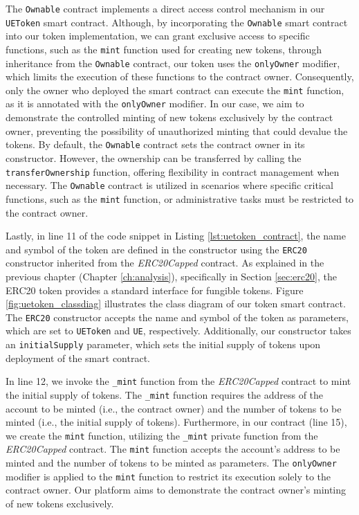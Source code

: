 


The \texttt{Ownable} contract implements a direct access control mechanism in our \texttt{UEToken} smart contract. Although, by incorporating the
\texttt{Ownable} smart contract into our token implementation, we can grant exclusive access to specific functions, such as the \texttt{mint} function used for creating new tokens, through inheritance from the \texttt{Ownable} contract, our token uses the \texttt{onlyOwner} modifier,
which limits the execution of these functions to the contract owner. Consequently, only the owner who deployed the smart contract can execute
the \texttt{mint} function, as it is annotated with the \texttt{onlyOwner} modifier. In our case, we aim to demonstrate the controlled minting
of new tokens exclusively by the contract owner, preventing the possibility of unauthorized minting that could devalue the tokens.
By default, the \texttt{Ownable} contract sets the contract owner in its constructor. However, the ownership can be transferred by calling the
\texttt{transferOwnership} function, offering flexibility in contract management when necessary. The \texttt{Ownable} contract is utilized in
scenarios where specific critical functions, such as the \texttt{mint} function, or administrative tasks must be restricted to the contract
owner.


Lastly, in line 11 of the code snippet in Listing \ref{lst:uetoken_contract}, the name and symbol of the token are defined in the constructor using the \texttt{ERC20} constructor inherited from the \textit{ERC20Capped} contract. As explained in the previous chapter (Chapter \ref{ch:analysis}), specifically in Section \ref{sec:erc20}, the ERC20 token provides a standard interface for fungible tokens. Figure \ref{fig:uetoken_classdiag} illustrates the class diagram of our token smart contract. The \texttt{ERC20} constructor accepts the name and symbol of the token as parameters, which are set to \texttt{UEToken} and \texttt{UE}, respectively. Additionally, our constructor takes an \texttt{initialSupply} parameter, which sets the initial supply of tokens upon deployment of the smart contract.

In line 12, we invoke the \texttt{\_mint} function from the \textit{ERC20Capped} contract to mint the initial supply of tokens. The \texttt{\_mint} function requires the address of the account to be minted (i.e., the contract owner) and the number of tokens to be minted (i.e., the initial supply of tokens). Furthermore, in our contract (line 15), we create the \texttt{mint} function, utilizing the \texttt{\_mint} private function from the \textit{ERC20Capped} contract. The \texttt{mint} function accepts the account's address to be minted and the number of tokens to be minted as parameters. The \texttt{onlyOwner} modifier is applied to the \texttt{mint} function to restrict its execution solely to the contract owner. Our platform aims to demonstrate the contract owner's minting of new tokens exclusively.

